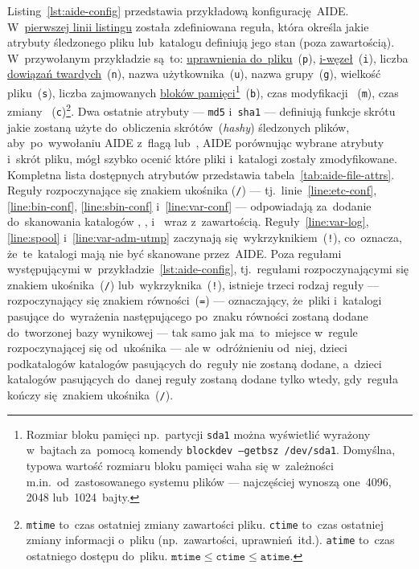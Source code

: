 \documentclass[thesis]{subfiles}
\begin{document}
Listing~\ref{lst:aide-config} przedstawia przykładową konfigurację~AIDE. W~\hyperref[line:custom-rule]{pierwszej linii listingu} została zdefiniowana reguła, która określa jakie atrybuty śledzonego pliku lub~katalogu definiują jego stan (poza zawartością). W~przywołanym przykładzie są~to: \href{https://www.linux.com/learn/understanding-linux-file-permissions}{uprawnienia do~pliku}~(\texttt{p}), \href{https://en.wikipedia.org/wiki/Inode}{i-węzeł}~(\texttt{i}), liczba \href{https://en.wikipedia.org/wiki/Hard_link}{dowiązań twardych}~(\texttt{n}), nazwa użytkownika~(\texttt{u}), nazwa grupy~(\texttt{g}), wielkość pliku~(\texttt{s}), liczba zajmowanych \href{https://en.wikipedia.org/wiki/Block_\%28data_storage\%29}{bloków pamięci}\footnote{Rozmiar bloku pamięci np.~partycji \texttt{sda1} można wyświetlić wyrażony w~bajtach za~pomocą komendy \texttt{blockdev --getbsz /dev/sda1}. Domyślna, typowa wartość rozmiaru bloku pamięci waha się w~zależności m.in.~od~zastosowanego systemu plików --- najczęściej wynoszą one~4096, 2048 lub~1024~bajty.}~(\texttt{b}), czas modyfikacji ~(\texttt{m}), czas zmiany ~(\texttt{c})\footnote{\texttt{mtime} to~czas ostatniej zmiany zawartości pliku. \texttt{ctime} to~czas ostatniej zmiany informacji o~pliku (np.~zawartości, uprawnień~itd.). \texttt{atime} to~czas ostatniego dostępu do~pliku. $\texttt{mtime} \leq \texttt{ctime} \leq \texttt{atime}$.}. Dwa ostatnie atrybuty --- \texttt{md5} i~\texttt{sha1} --- definiują funkcje skrótu jakie zostaną użyte do~obliczenia skrótów~(\emph{hashy}) śledzonych plików, aby~po~wywołaniu AIDE z~flagą  lub~, AIDE porównując wybrane atrybuty i~skrót pliku, mógł szybko ocenić które pliki i~katalogi zostały zmodyfikowane. Kompletna lista dostępnych atrybutów przedstawia tabela~\ref{tab:aide-file-attrs}. Reguły rozpoczynające się znakiem ukośnika (\texttt{/}) --- tj.~linie~\ref{line:etc-conf}, \ref{line:bin-conf}, \ref{line:sbin-conf} i~\ref{line:var-conf} --- odpowiadają za~dodanie do~skanowania katalogów , ,  i~ wraz z~zawartością. Reguły~\ref{line:var-log}, \ref{line:spool} i~\ref{line:var-adm-utmp} zaczynają się~wykrzyknikiem~(\texttt{!}), co~oznacza, że~te~katalogi mają nie być skanowane przez~AIDE. Poza regułami występującymi w~przykładzie~\ref{lst:aide-config}, tj.~regułami rozpoczynającymi się znakiem ukośnika~(\texttt{/}) lub~wykrzyknika~(\texttt{!}), istnieje trzeci rodzaj reguły --- rozpoczynający się znakiem równości~(\texttt{=}) --- oznaczający, że~pliki i~katalogi pasujące do~wyrażenia następującego po~znaku równości zostaną dodane do~tworzonej bazy wynikowej --- tak samo jak ma~to~miejsce w~regule rozpoczynającej się od~ukośnika --- ale w~odróżnieniu od~niej, dzieci podkatalogów katalogów pasujących do~reguły nie zostaną dodane, a~dzieci katalogów pasujących do~danej reguły zostaną dodane tylko wtedy, gdy~reguła kończy się~znakiem ukośnika~(\texttt{/}).
\end{document}
